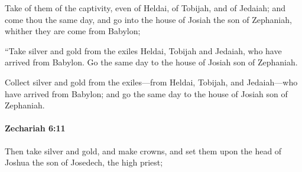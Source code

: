			\begin{versebox}
					\item[BHS] 
					\item[LXX] 
					\item[ASV] Take of them of the captivity, even of Heldai, of Tobijah, and of Jedaiah; and come thou the same day, and go into the house of Josiah the son of Zephaniah, whither they are come from Babylon;
					\item[NIV] “Take silver and gold from the exiles Heldai, Tobijah and Jedaiah, who have arrived from Babylon. Go the same day to the house of Josiah son of Zephaniah.
					\item[NRSV] Collect silver and gold from the exiles—from Heldai, Tobijah, and Jedaiah—who have arrived from Babylon; and go the same day to the house of Josiah son of Zephaniah.
			\end{versebox}

		\paragraph{Zechariah 6:11} %
			\label{ZECHARIAH-6-11}

			Then take silver and gold, and make crowns, and set them upon the head of Joshua the son of Josedech, the high priest;

